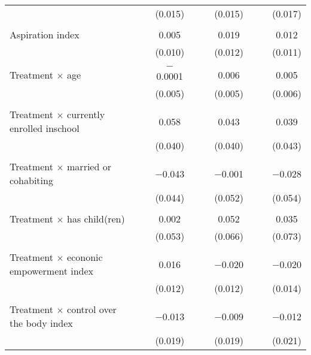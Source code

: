 \begin{table}[!htbp]
\begin{tabular}{@{\extracolsep{5pt}}lccccccccc}
  &  &  & (0.015) &  &  & (0.015) &  &  & (0.017) \\ 
  & & & & & & & & & \\ 
 Aspiration index &  &  & 0.005 &  &  & 0.019 &  &  & 0.012 \\ 
  &  &  & (0.010) &  &  & (0.012) &  &  & (0.011) \\ 
  & & & & & & & & & \\ 
 Treatment $\times$ age &  &  & $-$0.0001 &  &  & 0.006 &  &  & 0.005 \\ 
  &  &  & (0.005) &  &  & (0.005) &  &  & (0.006) \\ 
  & & & & & & & & & \\ 
 \makecell[l]{Treatment $\times$ currently\\\hspace{1em}enrolled inschool} &  &  & 0.058 &  &  & 0.043 &  &  & 0.039 \\ 
  &  &  & (0.040) &  &  & (0.040) &  &  & (0.043) \\ 
  & & & & & & & & & \\ 
 \makecell[l]{Treatment $\times$ married\\\hspace{1em}or cohabiting} &  &  & $-$0.043 &  &  & $-$0.001 &  &  & $-$0.028 \\ 
  &  &  & (0.044) &  &  & (0.052) &  &  & (0.054) \\ 
  & & & & & & & & & \\ 
 \makecell[l]{Treatment $\times$ has\\\hspace{1em}child(ren)} &  &  & 0.002 &  &  & 0.052 &  &  & 0.035 \\ 
  &  &  & (0.053) &  &  & (0.066) &  &  & (0.073) \\ 
  & & & & & & & & & \\ 
 \makecell[l]{Treatment $\times$ econonic\\\hspace{1em}empowerment index} &  &  & 0.016 &  &  & $-$0.020 &  &  & $-$0.020 \\ 
  &  &  & (0.012) &  &  & (0.012) &  &  & (0.014) \\ 
  & & & & & & & & & \\ 
 \makecell[l]{Treatment $\times$ control\\\hspace{1em}over the body index} &  &  & $-$0.013 &  &  & $-$0.009 &  &  & $-$0.012 \\ 
  &  &  & (0.019) &  &  & (0.019) &  &  & (0.021) \\ 

\end{tabular}
\end{table}
